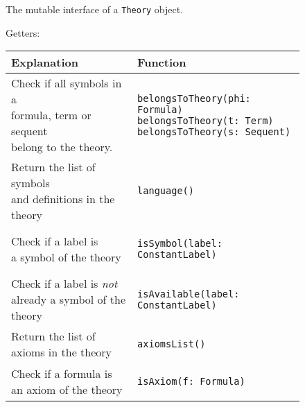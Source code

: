 {\begin{figure}
\begin{center}
\begin{tabular}{l|l}
\end{tabular}
\caption{The mutable interface of a \lstinline{Theory}{} object. \label{fig:theorysetters}}
\end{center}
\end{figure}



\begin{figure}
Getters:
\begin{center}
\begin{tabular}{l|l}
Explanation & Function
\\ \hline

\makecell[l]{Check if all symbols in a\\formula, term or sequent\\belong to the theory.} & 
\begin{lstlisting}
belongsToTheory(phi: Formula)
belongsToTheory(t: Term)
belongsToTheory(s: Sequent)
\end{lstlisting}
\\ %

\makecell[l]{Return the list of symbols\\and definitions in the theory} & 
\begin{lstlisting}
language()
\end{lstlisting}
\\ %

\makecell[l]{Check if a label is\\a symbol of the theory} &
\begin{lstlisting}
isSymbol(label: ConstantLabel)
\end{lstlisting}
\\ %

\makecell[l]{Check if a label is \textit{not}\\already a symbol of the theory} &
\begin{lstlisting}
isAvailable(label: ConstantLabel)
\end{lstlisting}
\\ %

\makecell[l]{Return the list of\\axioms in the theory} &
\begin{lstlisting}
axiomsList()
\end{lstlisting}
\\ %

\makecell[l]{Check if a formula is\\an axiom of the theory} &
\begin{lstlisting}
isAxiom(f: Formula)
\end{lstlisting}
\\ %


\end{tabular}
\end{center}
\end{figure}}
